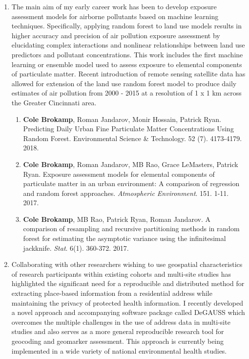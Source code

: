 \documentclass{nihbiosketch}
\begin{document}
\begin{enumerate}


\item The main aim of my early career work has been to develop exposure assessment models for airborne pollutants based on machine learning techniques.  Specifically, applying random forest to land use models results in higher accuracy and precision of air pollution exposure assessment by elucidating complex interactions and nonlinear relationships between land use predictors and pollutant concentrations. This work includes the first machine learning or ensemble model used to assess exposure to elemental components of particulate matter. Recent introduction of remote sensing satellite data has allowed for extension of the land use random forest model to produce daily estimates of air pollution from 2000 - 2015 at a resolution of 1 x 1 km across the Greater Cincinnati area.

\begin{enumerate}
	
	\item \textbf{Cole Brokamp}, Roman Jandarov, Monir Hossain, Patrick Ryan. Predicting Daily Urban Fine Particulate Matter Concentrations Using Random Forest. Environmental Science \& Technology. 52 (7). 4173-4179. 2018.

	\item \textbf{Cole Brokamp}, Roman Jandarov, MB Rao, Grace LeMasters, Patrick Ryan. Exposure assessment models for elemental components of particulate matter in an urban environment: A comparison of regression and random forest approaches. \textit{Atmospheric Environment}. 151. 1-11. 2017.
	
	\item \textbf{Cole Brokamp}, MB Rao, Patrick Ryan, Roman Jandarov. A comparison of resampling and recursive partitioning methods in random forest for estimating the asymptotic variance using the infinitesimal jackknife. \textit{Stat}. 6(1). 360-372. 2017.

\end{enumerate}

\item Collaborating with other researchers wishing to use geospatial characteristics of research participants within existing cohorts and multi-site studies has highlighted the significant need for a reproducible and distributed method for extracting place-based information from a residential address while maintaining the privacy of protected health information. I recently developed a novel approach and accompanying software package called DeGAUSS which overcomes the multiple challenges in the use of address data in multi-site studies and also serves as a more general reproducible research tool for geocoding and geomarker assessment. This approach is currently being implemented in a wide variety of national environmental health studies.


\end{enumerate}
\end{document}
